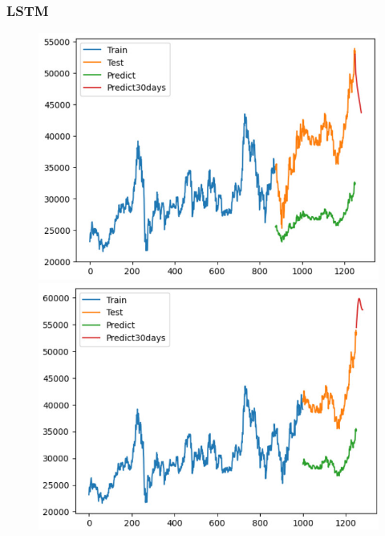 \subsubsection{LSTM}
\begin{figure}[H]
    \centering
    \begin{minipage}{0.15\textwidth}
    \centering
    \includegraphics[width=1\textwidth]{resources/chapter-5/result/BIDV_LSTM_7_3.jpg}
    \end{minipage}
    \hfill
    \begin{minipage}{0.15\textwidth}
    \centering
    \includegraphics[width=1\textwidth]{resources/chapter-5/result/BIDV_LSTM_8_2.jpg}
    \end{minipage}
    \hfill
        \begin{minipage}{0.15\textwidth}

\end{minipage}
\end{figure}
